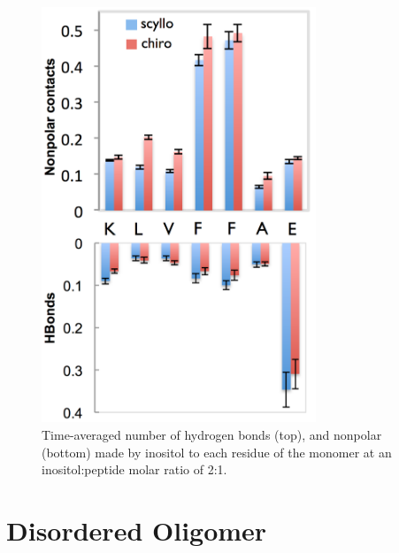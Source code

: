\begin{figure}[ht]
\centering
\includegraphics[width=8.21cm]{figures/appendixA/inos2_figures_SI_monomerBinding.pdf}
\caption{Time-averaged number of hydrogen bonds (top), and nonpolar (bottom) made by inositol to each residue of the monomer at an inositol:peptide molar ratio of 2:1.}
\label{fig:SI-monomersBinding}
\end{figure}

\clearpage
\newpage

\section{Disordered Oligomer}

